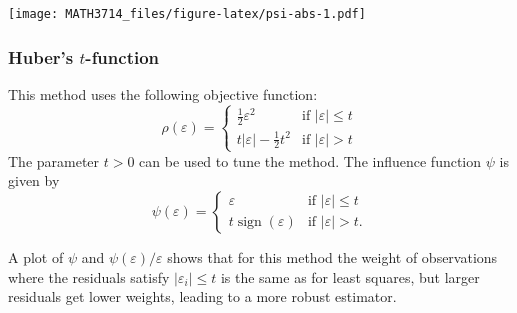 \documentclass[
  a4paper,
]{article}
\theoremstyle{definition}
\theoremstyle{definition}
\theoremstyle{definition}
\theoremstyle{definition}
\theoremstyle{remark}
\begin{document}
\texttt{[image: MATH3714\_files/figure-latex/psi-abs-1.pdf]}

\hypertarget{Huber}{%
\subsubsection{\texorpdfstring{Huber's \(t\)-function}{Huber's t-function}}\label{Huber}}

This method uses the following objective function:
\begin{equation*}
  \rho(\varepsilon)
  = \begin{cases}
    \frac12 \varepsilon^2 & \mbox{if } |\varepsilon|\leq t \\
    t|\varepsilon| - \frac12 t^2 & \mbox{if } |\varepsilon| > t
  \end{cases}
\end{equation*}
The parameter \(t > 0\) can be used to tune the method. The influence function
\(\psi\) is given by
\begin{equation*}
\psi(\varepsilon)
= \begin{cases}
\varepsilon& \mbox{if } |\varepsilon|\leq t \\
t \mathop{\mathrm{sign}}(\varepsilon) & \mbox{if } |\varepsilon| > t.
\end{cases}
\end{equation*}

A plot of \(\psi\) and \(\psi(\varepsilon) / \varepsilon\) shows that for this method
the weight of observations where the residuals satisfy \(|\varepsilon_i| \leq t\)
is the same as for least squares, but larger residuals get lower weights,
leading to a more robust estimator.
\end{document}
